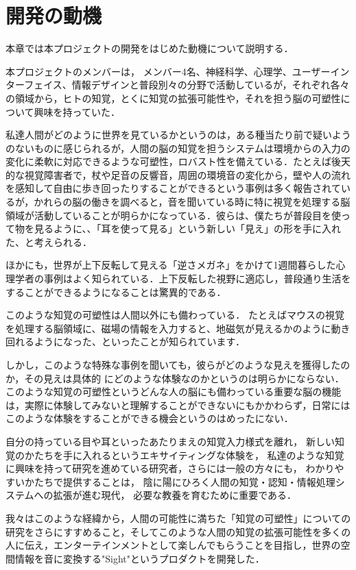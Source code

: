 \section{開発の動機}

本章では本プロジェクトの開発をはじめた動機について説明する．

本プロジェクトのメンバーは，
メンバー4名、神経科学、心理学、ユーザーインターフェイス、情報デザインと普段別々の分野で活動しているが，それぞれ各々の領域から，ヒトの知覚，とくに知覚の拡張可能性や，それを担う脳の可塑性について興味を持っていた．

私達人間がどのように世界を見ているかというのは，ある種当たり前で疑いようのないものに感じられるが，人間の脳の知覚を担うシステムは環境からの入力の変化に柔軟に対応できるような可塑性，ロバスト性を備えている．たとえば後天的な視覚障害者で，杖や足音の反響音，周囲の環境音の変化から，壁や人の流れを感知して自由に歩き回ったりすることができるという事例は多く報告されているが，かれらの脳の働きを調べると，音を聞いている時に特に視覚を処理する脳領域が活動していることが明らかになっている．彼らは、僕たちが普段目を使って物を見るように、、「耳を使って見る」という新しい「見え」の形を手に入れた、と考えられる．

ほかにも，世界が上下反転して見える「逆さメガネ」をかけて1週間暮らした心理学者の事例はよく知られている．上下反転した視野に適応し，普段通り生活をすることができるようになることは驚異的である．

このような知覚の可塑性は人間以外にも備わっている．
たとえばマウスの視覚を処理する脳領域に、磁場の情報を入力すると、地磁気が見えるかのように動き回れるようになった、といったことが知られています．

しかし，このような特殊な事例を聞いても，彼らがどのような見えを獲得したのか，その見えは具体的
にどのような体験なのかというのは明らかにならない．このような知覚の可塑性というどんな人の脳にも備わっている重要な脳の機能は，実際に体験してみないと理解することができないにもかかわらず，日常にはこのような体験をすることができる機会というのはめったにない．

自分の持っている目や耳といったあたりまえの知覚入力様式を離れ，
新しい知覚のかたちを手に入れるというエキサイティングな体験を，
私達のような知覚に興味を持って研究を進めている研究者，さらには一般の方々にも，
わかりやすいかたちで提供することは，
陰に陽にひろく人間の知覚・認知・情報処理システムへの拡張が進む現代，
必要な教養を育むために重要である．

我々はこのような経緯から，人間の可能性に満ちた「知覚の可塑性」についての研究をさらにすすめること，そしてこのような人間の知覚の拡張可能性を多くの人に伝え，エンターテインメントとして楽しんでもらうことを目指し，世界の空間情報を音に変換する"Sight"というプロダクトを開発した．















